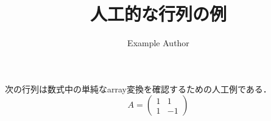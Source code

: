 \documentclass{article}
\title{人工的な行列の例}
\author{Example Author}
\begin{document}
\maketitle

次の行列は数式中の単純なarray変換を確認するための人工例である．
\[
A=\left(
  \begin{array}{cc}
    1 & 1 \\
    1 & -1
  \end{array}
\right)
\]
\end{document}
